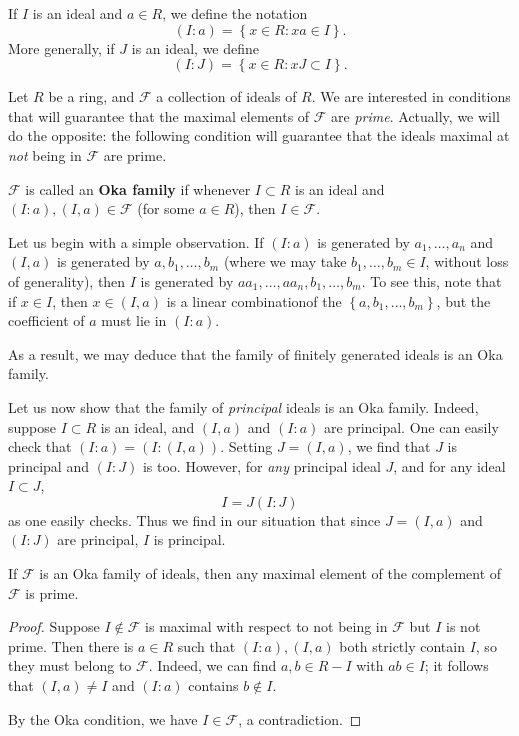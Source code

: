 If $I$ is an ideal and $a \in R$, we define the notation
\[ (I:a) = \left\{ x\in R: xa \in I\right\} . \]
More generally, if $J$ is an ideal, we define
\[ (I:J) = \left\{x \in R: xJ \subset I\right\} . \]

Let $R$ be a ring, and $\mathcal{F}$ a collection of ideals of $R$. 
We are interested in conditions that will guarantee that the maximal elements
of $\mathcal{F}$ are \emph{prime}.
Actually, we will do the opposite: the following condition will guarantee that
the ideals maximal at \emph{not} being in $\mathcal{F}$ are prime. 

\begin{definition} \label{okafamily}
$\mathcal{F}$ is called an \textbf{Oka family} if whenever $I \subset R$ is an
ideal and $(I:a), (I,a) \in \mathcal{F}$ (for some $a \in R$), then $I \in
\mathcal{F}$.
\end{definition} 

\begin{example} \label{exm:okacard}
Let us begin with a simple observation. If $(I:a)$ is generated by
$a_1, \dots, a_n$ and $(I,a)$ is generated by $a, b_1, \dots, b_m$ (where we
may take
$b_1, \dots, b_m \in I$, without loss of generality), then $I$
is generated by $aa_1, \dots, aa_n, b_1, \dots, b_m$.
To see this, note that if $x \in I$, then $x \in (I,a)$ is a linear
combinationof the $\left\{a, b_1, \dots, b_m\right\}$, but the coefficient of
$a$ must
lie in $(I:a)$.

As a result, we may deduce that
the family of finitely generated ideals is an Oka family.
\end{example} 

\begin{example} 
Let us now show that the family of \emph{principal} ideals is an Oka family.
Indeed, suppose $I \subset R$ is an ideal, and $(I,a)$ and $(I:a)$ are
principal.
One can easily check that
$(I:a) = (I: (I, a))$.
Setting $J = (I,a)$, we find that $J$ is principal and $(I:J)$ is too.
However, for \emph{any} principal ideal $J$, and for any ideal $I \subset J$,
\[ I = J (I: J)  \]
as one easily checks. Thus we find in our situation that since $J=(I,a)$ and
$(I:J)$
are principal, $I$ is principal.
\end{example} 

\begin{proposition}\label{okathm} If $\mathcal{F}$ is an Oka
family of
ideals, then any maximal element of the complement of $\mathcal{F}$ is prime.
\end{proposition} 
\begin{proof} 
Suppose $I \notin \mathcal{F}$ is maximal with respect 
to not being in $\mathcal{F}$
but $I$ is  not prime.
Then there is $a \in R$ such that $(I:a), (I,a)$ both strictly contain $I$,
so they must belong to $\mathcal{F}$.
Indeed, we can find $a,b \in R - I$ with $ab \in I$; it follows that $(I,a)
\neq I$ and $(I:a)$ contains $b \notin I$.

By the Oka condition, we have $I \in
\mathcal{F}$, a contradiction.
\end{proof} 

